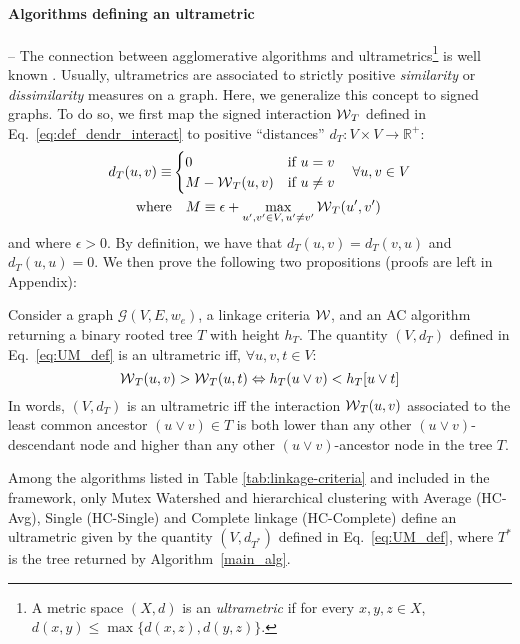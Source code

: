 \paragraph{Algorithms defining an ultrametric} -- The connection between agglomerative algorithms and ultrametrics\footnote{A metric space $(X,d)$ is an \emph{ultrametric} if for every $x,y,z \in X$, $d(x,y)\leq \max \{d(x,z), d(y,z)\}$.} is well known \cite{johnson1967hierarchical,milligan1979ultrametric}. Usually, ultrametrics are associated to strictly positive \emph{similarity} or \emph{dissimilarity} measures on a graph. Here, we generalize this concept to signed graphs. To do so, we first map the signed interaction $\mathcal{W}{}_{T}{}$ defined in Eq.~\ref{eq:def_dendr_interact} to positive ``distances'' $d_{T}:V \times V \rightarrow \mathbb{R}^{+}$:
\begin{align}\label{eq:UM_def}
d_{T}(u,v)\equiv &\begin{cases}
0 & \text{if}\,\, u=v\\
M-\mathcal{W}{}_{T}(u,v) & \text{if}\,\, u\neq v
\end{cases}\quad \forall u,v\in V\\
\mathrm{where}& \quad  M \equiv  \epsilon + \max_{u',v'\in V,\,u'\neq v'}\mathcal{W}{}_{T}(u',v')
\end{align}
and where $\epsilon > 0$. By definition, we have that $d_{T}(u,v)=d_{T}(v,u)$ and $d_{T}(u,u)= 0$. We then prove the following two propositions (proofs are left in Appendix):
\begin{prop}
Consider a graph $\mathcal{G}(V,E,w_e)$, a linkage criteria $\mathcal{W}{}$, and an AC algorithm returning a binary rooted tree $T$ with height $h_T$. The quantity $(V, d_{T})$ defined in Eq.~\ref{eq:UM_def} is an ultrametric iff, $\forall u,v,t \in V$:
\begin{equation}
\mathcal{W}{}_{T}(u,v) > \mathcal{W}{}_{T}(u,t) \Leftrightarrow h_T(u \vee v) < h_T[u \vee t] 
\end{equation}
In words, $(V, d_{T})$ is an ultrametric iff the interaction $\mathcal{W}{}_{T}(u, v)$ associated to the least common ancestor ${(u\vee v)\in T}$ is both lower than any other $(u\vee v)$-descendant node and higher than any other $(u\vee v)$-ancestor node in the tree $T$.
\end{prop}
\begin{prop}
Among the algorithms listed in Table \ref{tab:linkage-criteria} and included in the \algname{} framework, only Mutex Watershed and hierarchical clustering with Average (HC-Avg), Single (HC-Single) and Complete linkage (HC-Complete) define an ultrametric given by the quantity $(V, d_{T^*})$ defined in Eq.~\ref{eq:UM_def}, where $T^*$ is the tree returned by Algorithm~\ref{main_alg}.
\end{prop}





